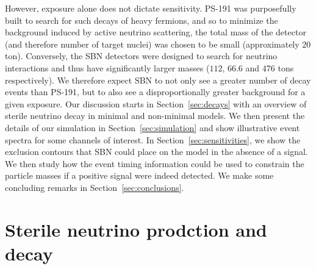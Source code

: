 \documentclass[11pt, a4paper]{article}
\newcommand{\refsec}[1]{Section~\ref{#1}}
\begin{document}
However, exposure alone does not dictate sensitivity. PS-191 was purposefully
built to search for such decays of heavy fermions, and so to minimize
the background induced by active neutrino scattering, the total mass of the
detector (and therefore number of target nuclei) was chosen to be small
(approximately $20$ ton). Conversely, the SBN detectors were designed to search
for neutrino interactions and thus have significantly larger masses ($112$,
$66.6$ and $476$ tons respectively). We therefore expect SBN to not only see a
greater number of decay events than PS-191, but to also see a disproportionally
greater background for a given exposure.
%
Our discussion starts in \refsec{sec:decays} with an overview of sterile
neutrino decay in minimal and non-minimal models. We then present the details
of our simulation in \refsec{sec:simulation} and show illustrative event
spectra for some channels of interest. In \refsec{sec:sensitivities}, we show
the exclusion contours that SBN could place on the model in the absence of a
signal. We then study how the event timing information could be used to
constrain the particle masses if a positive signal were indeed detected. We
make some concluding remarks in \refsec{sec:conclusions}.

\section{\label{sec:decays}Sterile neutrino prodction and decay}
\end{document}
